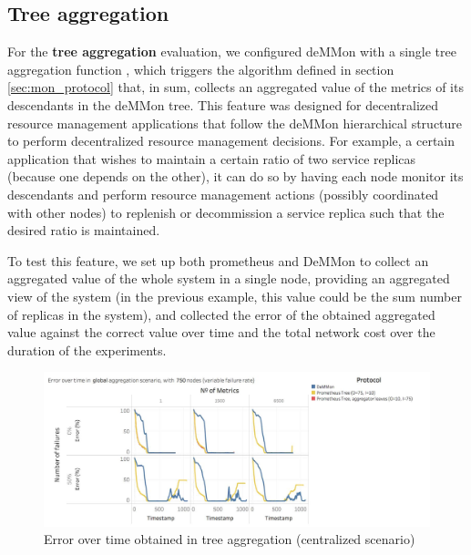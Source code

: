 \subsection{Tree aggregation}

For the \textbf{tree aggregation} evaluation, we configured deMMon with a single tree aggregation function , which triggers the algorithm defined in section \ref{sec:mon_protocol} that, in sum, collects an aggregated value of the metrics of its descendants in the deMMon tree. This feature was designed for decentralized resource management applications that follow the deMMon hierarchical structure to perform decentralized resource management decisions. For example, a certain application that wishes to maintain a certain ratio of two service replicas (because one depends on the other), it can do so by having each node monitor its descendants and perform resource management actions (possibly coordinated with other nodes) to replenish or decommission a service replica such that the desired ratio is maintained.

To test this feature, we set up both prometheus and DeMMon to collect an aggregated value of the whole system in a single node, providing an aggregated view of the system (in the previous example, this value could be the sum number of replicas in the system), and collected the error of the obtained aggregated value against the correct value over time and the total network cost over the duration of the experiments. 

\begin{figure}
    \centering
    \includegraphics[width=\linewidth]{Chapters/evaluation/figures/aggregation/Error_over_time_global_tree.jpg}
    \caption{Error over time obtained in tree aggregation (centralized scenario)}
    \label{fig:sec:mon_eval_tree_centralized}
\end{figure}

